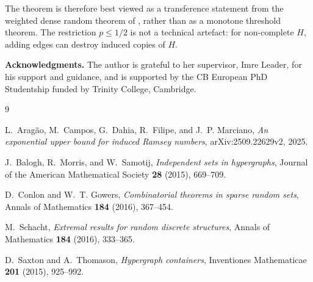 \documentclass[11pt,reqno]{amsart}
\numberwithin{equation}{section}
\theoremstyle{plain}
\theoremstyle{definition}
\begin{document}
The theorem is therefore best viewed as a transference statement from the
weighted dense random theorem of \cite{ACDFM}, rather than as a monotone
threshold theorem.  The restriction $p\le1/2$ is not a technical artefact: for
non-complete $H$, adding edges can destroy induced copies of $H$.

\textbf{Acknowledgments.}
The author is grateful to her supervisor, Imre Leader, for his support and guidance, and is supported by the CB European PhD Studentship funded by Trinity College, Cambridge.
\begin{thebibliography}{9}

L.~Arag\~ao, M.~Campos, G.~Dahia, R.~Filipe, and J.~P. Marciano,
\emph{An exponential upper bound for induced Ramsey numbers},
arXiv:2509.22629v2, 2025.

J.~Balogh, R.~Morris, and W.~Samotij,
\emph{Independent sets in hypergraphs},
Journal of the American Mathematical Society \textbf{28} (2015), 669--709.

D.~Conlon and W.~T. Gowers,
\emph{Combinatorial theorems in sparse random sets},
Annals of Mathematics \textbf{184} (2016), 367--454.

M.~Schacht,
\emph{Extremal results for random discrete structures},
Annals of Mathematics \textbf{184} (2016), 333--365.

D.~Saxton and A.~Thomason,
\emph{Hypergraph containers},
Inventiones Mathematicae \textbf{201} (2015), 925--992.

\end{thebibliography}
\end{document}
